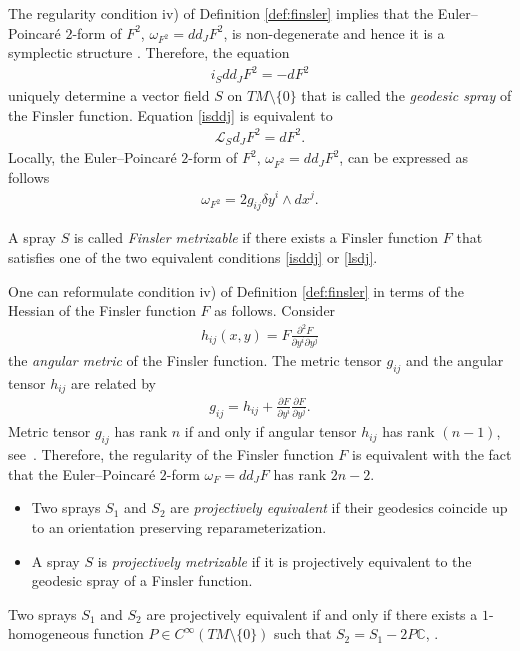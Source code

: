 The regularity condition iv) of Def\/inition \ref{def:finsler} implies that the
Euler--Poincar\'e $2$-form of $F^2$, $\omega_{F^2}=dd_JF^2$, is non-degenerate
and hence it is a symplectic structure \cite{deleon89, morandi90}. Therefore, the equation
\begin{gather} i_Sdd_JF^2=-dF^2 \label{isddj}
\end{gather}
uniquely determine a vector f\/ield $S$ on $TM\setminus\{0\}$ that is called the
\emph{geodesic spray} of the Finsler function. Equation \eqref{isddj}
is equivalent to
\begin{gather} \mathcal{L}_Sd_JF^2=dF^2. \label{lsdj}
\end{gather}
Locally, the Euler--Poincar\'e $2$-form of $F^2$, $\omega_{F^2}=dd_JF^2$, can
be expressed as follows
\begin{gather*}
\omega_{F^2}=2g_{ij}\delta y^i \wedge dx^j. %
\end{gather*}
\begin{Definition} \label{defn:finsler_metr}
A spray $S$ is called \emph{Finsler metrizable} if there exists a
Finsler function $F$ that satisf\/ies one of the two equivalent
conditions \eqref{isddj} or \eqref{lsdj}.
\end{Definition}
One can reformulate condition iv) of Def\/inition \ref{def:finsler}
in terms of the Hessian of the Finsler function $F$ as follows.
Consider
\begin{gather*}
h_{ij}(x,y)=F\frac{\partial^2 F}{\partial y^i\partial y^j}
\end{gather*} the \emph{angular metric} of the Finsler function.
The metric tensor $g_{ij}$ and the angular tensor $h_{ij}$ are
related by
\begin{gather*}
g_{ij}=h_{ij} + \frac{\partial F}{\partial y^i} \frac{\partial
F}{\partial y^j}. %
\end{gather*} Metric tensor
$g_{ij}$ has rank $n$ if and only if angular tensor $h_{ij}$ has
rank $(n-1)$, see~\cite{matsumoto86}. Therefore, the regularity of
the Finsler function $F$ is equivalent with the fact that the
Euler--Poincar\'e $2$-form $\omega_{F}=dd_JF$ has rank $2n-2$.
\begin{Definition}\qquad
\begin{itemize} \itemsep=0pt \item[i)] Two sprays $S_1$ and $S_2$ are \emph{projectively equivalent}
if their geodesics coincide up to an orientation preserving
reparameterization. \item[ii)] A spray $S$ is \emph{projectively
metrizable} if it is projectively equivalent to the geodesic spray
of a Finsler function.
\end{itemize}
\end{Definition}
Two sprays $S_1$ and $S_2$ are projectively equivalent if and only
if there exists a $1$-homogeneous function $P\in
C^{\infty}(TM\setminus\{0\})$ such that $S_2=S_1-2P\mathbb{C}$,
\cite{aim93, shen01}.

